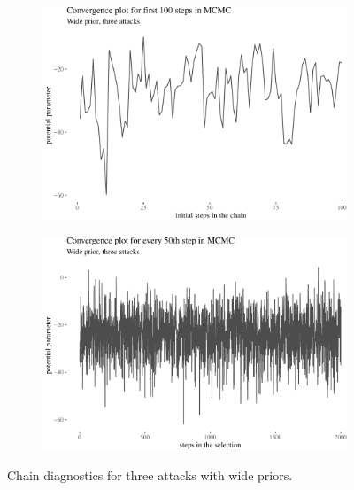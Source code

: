 \documentclass[10pt,]{scrartcl}
\begin{document}
\begin{figure}[!ht]
\begin{subfigure}[!ht]{0.45\textwidth}

\begin{center}\includegraphics[width=1\linewidth]{redditAnalysisWalkthrough_files/figure-latex/unnamed-chunk-52-1} \end{center}
\end{subfigure} \hfill
\begin{subfigure}[!ht]{0.45\textwidth}

\begin{center}\includegraphics[width=1\linewidth]{redditAnalysisWalkthrough_files/figure-latex/unnamed-chunk-53-1} \end{center}
\end{subfigure}
\caption{Chain diagnostics for three attacks with wide priors.}
\label{fig:chains}
\end{figure}
\end{document}
